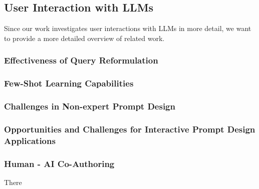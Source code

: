 
\subsection{User Interaction with LLMs}
\label{subsec:user-interaction-with-llms}
Since our work investigates user interactions with LLMs in more detail, we want to provide a more detailed
overview of related work.

\subsubsection{Effectiveness of Query Reformulation}
%

\subsubsection{Few-Shot Learning Capabilities}

\subsubsection{Challenges in Non-expert Prompt Design}

\subsubsection{Opportunities and Challenges for Interactive Prompt Design Applications}


\subsubsection{Human - AI Co-Authoring}



There